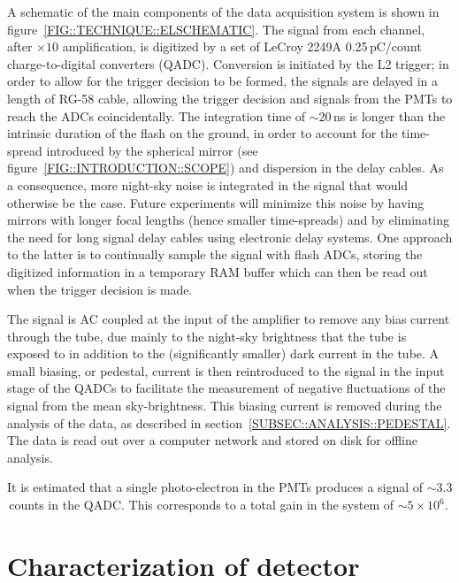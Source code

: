 A schematic of the main components of the data acquisition system is
shown in figure~\ref{FIG::TECHNIQUE::ELSCHEMATIC}. The signal from
each channel, after $\times10$ amplification, is digitized by a set of
LeCroy 2249A 0.25\,pC/count charge-to-digital converters (QADC).
Conversion is initiated by the L2 trigger; in order to allow for the
trigger decision to be formed, the signals are delayed in a length of
RG-58 cable, allowing the trigger decision and signals from the PMTs
to reach the ADCs coincidentally. The integration time of $\sim$20\,ns
is longer than the intrinsic duration of the \Cerenkov flash on the
ground, in order to account for the time-spread introduced by the
spherical mirror (see figure~\ref{FIG::INTRODUCTION::SCOPE}) and
dispersion in the delay cables. As a consequence, more night-sky noise
is integrated in the signal that would otherwise be the case. Future
experiments will minimize this noise by having mirrors with longer
focal lengths (hence smaller time-spreads) and by eliminating the need
for long signal delay cables using electronic delay systems. One
approach to the latter is to continually sample the signal with flash
ADCs, storing the digitized information in a temporary RAM buffer
which can then be read out when the trigger decision is made.

The signal is AC coupled at the input of the amplifier to remove any
bias current through the tube, due mainly to the night-sky brightness
that the tube is exposed to in addition to the (significantly smaller)
dark current in the tube. A small biasing, or pedestal, current is
then reintroduced to the signal in the input stage of the QADCs to
facilitate the measurement of negative fluctuations of the signal from
the mean sky-brightness. This biasing current is removed during the
analysis of the data, as described in
section~\ref{SUBSEC::ANALYSIS::PEDESTAL}. The data is read out over a
computer network and stored on disk for offline analysis.

It is estimated that a single photo-electron in the PMTs produces a
signal of $\sim3.3$\,counts in the QADC. This corresponds to a total
gain in the system of $\sim5\times10^{6}$.

\section{Characterization of detector}
\label{SEC::TECHNIQUE::CHARACTERISTICS}

